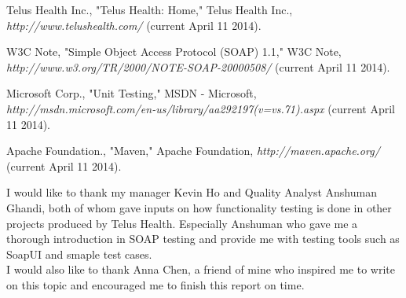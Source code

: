 \documentclass[12pt]{article}
\begin{document}
\newpage



\begin{thebibliography}{1}

   Telus Health Inc., "Telus Health: Home," Telus Health Inc., {\em http://www.telushealth.com/} (current April 11 2014).

   W3C Note, "Simple Object Access Protocol (SOAP) 1.1," W3C Note, {\em http://www.w3.org/TR/2000/NOTE-SOAP-20000508/} (current April 11 2014).

 Microsoft Corp., "Unit Testing," MSDN - Microsoft, {\em http://msdn.microsoft.com/en-us/library/aa292197(v=vs.71).aspx} (current April 11 2014).

 Apache Foundation., "Maven," Apache Foundation, {\em http://maven.apache.org/} (current April 11 2014).

\end{thebibliography}
\newpage


I would like to thank my manager Kevin Ho and Quality Analyst Anshuman Ghandi, both of whom gave inputs on how functionality testing is done in other projects produced by Telus Health. Especially Anshuman who gave me a thorough introduction in SOAP testing and provide me with testing tools such as SoapUI and smaple test cases.\\

I would also like to thank Anna Chen, a friend of mine who inspired me to write on this topic and encouraged me to finish this report on time.\\
\newpage

\end{document}
